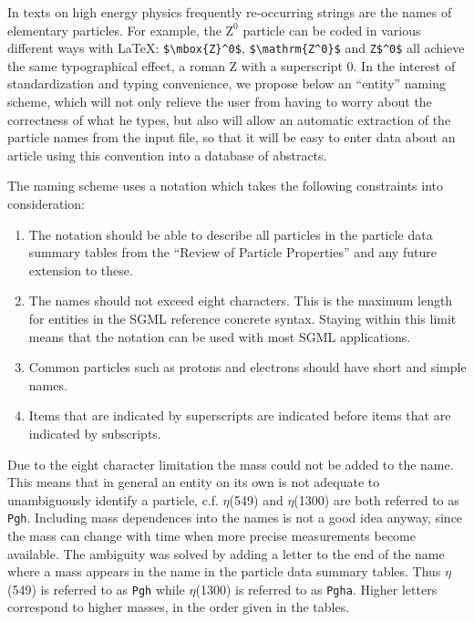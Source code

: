 \documentclass{article}
\begin{document}
In texts on high energy physics frequently
re-occurring strings are the names of elementary particles.
For example, the $\mbox{Z}^{0}$
particle can be coded in various
different ways with \LaTeX: \verb+$\mbox{Z}^0$+,
\verb+$\mathrm{Z^0}$+ and  \verb+Z$^0$+
all achieve the same typographical effect, a roman
Z with a superscript 0. In the interest of standardization and
typing convenience, we propose below an ``entity'' naming scheme,
which will not only relieve the user from having to worry about the
correctness of what he types, but also will allow an automatic extraction
of the particle names from the input file, so that it will be easy to enter
data about an article using this convention into a database of abstracts.
 
The naming scheme uses a notation which takes the
following constraints into consideration:
\begin{enumerate}
\item The notation should be able to describe
all particles in the particle data summary tables from the
``Review of Particle Properties''\cite{PPD} and
any future extension to these.
\item The names should not exceed
eight characters. This is the maximum length for entities in the
SGML reference concrete syntax\cite{ERIC1}. Staying within this
limit means that the notation can be used with most SGML applications.
\item Common particles such as protons and electrons
should have short and simple names.
\item Items that are indicated by superscripts are indicated before
items that are indicated by subscripts.
 
\end{enumerate}
 
Due to the eight character limitation the mass could not be added to
the name. This means that in general an entity on its own is not
adequate to unambiguously identify a particle, c.f.
$\eta $(549) and $\eta $(1300) are both referred to as \texttt{Pgh}.
Including mass dependences into the names is not a good idea anyway,
since the mass can change with time
when more precise measurements become available.
The ambiguity was solved by adding a letter to the end
of the name where a mass appears in the name in the particle data
summary tables. Thus $\eta $(549) is referred to as \texttt{Pgh}
while $\eta $(1300) is referred to as \texttt{Pgha}. Higher letters
correspond to higher masses, in the order given in the tables.
 
\end{document}
